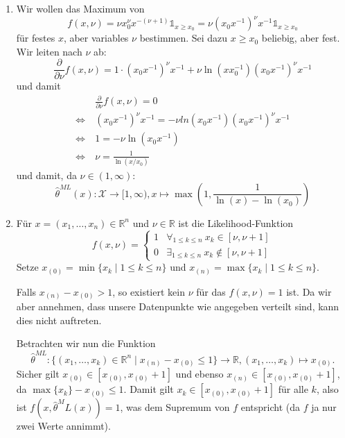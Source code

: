 \documentclass[a4paper]{article}
\begin{document}
\begin{enumerate}
    \item Wir wollen das Maximum von 
    \begin{equation*}
        f(x, \nu) = \nu x_0^\nu x^{-(\nu + 1)} \mathds{1}_{x \geq x_0} = \nu (x_0 x^{-1})^\nu x^{-1} \mathds{1}_{x \geq x_0} 
    \end{equation*}
    für festes $x$, aber variables $\nu$ bestimmen. Sei dazu $x \geq x_0$ beliebig, aber fest.
    Wir leiten nach $\nu$ ab:
    \begin{equation*}
        \frac{\partial}{\partial \nu} f(x, \nu) = 1 \cdot (x_0 x^{-1})^\nu x^{-1} + \nu \ln(x x_0^{-1}) (x_0 x^{-1})^\nu x^{-1}
    \end{equation*}
    und damit 
    \begin{align*}
        &\frac{\partial}{\partial \nu} f(x, \nu) = 0 \\
        \iff \ & (x_0 x^{-1})^\nu x^{-1} = - \nu ln(x_0 x^{-1}) (x_0 x^{-1})^\nu x^{-1} \\
        \iff \ & 1 = - \nu \ln (x_0 x^{-1}) \\
        \iff \ & \nu = \frac{1}{\ln(x / x_0)}
    \end{align*}
    und damit, da $\nu \in (1, \infty)$:
    \begin{equation*}
        \hat{\theta}^{ML} (x): \mathcal{X} \to [1, \infty), x \mapsto \max \left(1, \frac{1}{\ln(x) - \ln(x_0)}\right)
    \end{equation*}
    \item Für $x = (x_1, \dots, x_n) \in \mathds{R}^n$ und $\nu \in \mathds{R}$ ist die Likelihood-Funktion
    \begin{equation*}
        f(x, \nu) = \left\{ \begin{matrix}
            1 & \forall_{1 \leq k \leq n} \ x_k \in [\nu, \nu+1] \\
            0 & \exists_{1 \leq k \leq n} \ x_k \notin [\nu, \nu+1]
        \end{matrix} \right.
    \end{equation*}
    Setze $x_{(0)} = \min\{x_k \mid 1 \leq k \leq n\}$ und $x_{(n)} = \max\{x_k \mid 1 \leq k \leq n\}$.

    Falls  $x_{(n)} - x_{(0)} > 1$, so existiert kein $\nu$ für das $f(x, \nu) = 1$ ist.
    Da wir aber annehmen, dass unsere Datenpunkte wie angegeben verteilt sind, kann dies nicht auftreten. 

    Betrachten wir nun die Funktion
    \begin{equation*}
        \hat{\theta}^{ML}: \{ (x_1, \dots, x_k) \in \mathds{R}^n \mid x_{(n)} - x_{(0)} \leq 1 \} \to \mathds{R}, (x_1, \dots, x_k) \mapsto x_{(0)} \text{.}
    \end{equation*}
    Sicher gilt $x_{(0)} \in [x_{(0)}, x_{(0)} + 1]$ und ebenso $x_{(n)} \in [x_{(0)}, x_{(0)} + 1]$, da $\max \{x_k\} - x_{(0)} \leq 1$.
    Damit gilt $x_k \in [x_{(0)}, x_{(0)} + 1]$ für alle $k$, also ist $f(x, \hat{\theta}^ML(x)) = 1$, was dem Supremum von $f$ entspricht (da $f$ ja nur zwei Werte annimmt).


\end{enumerate}
\end{document}
